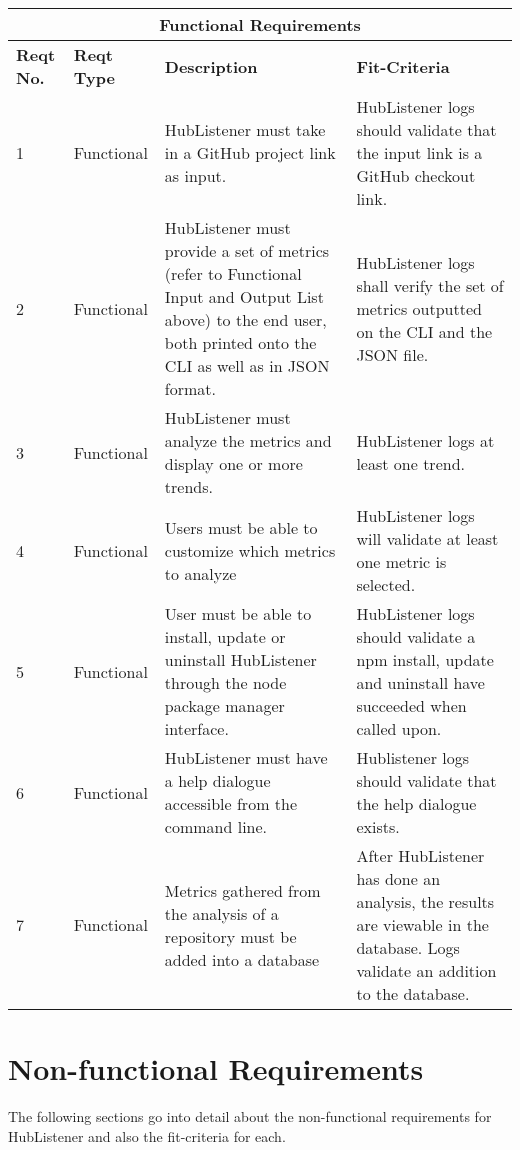 \documentclass{article}
\begin{document}
\begin{tabular}{ |p{1cm}|p{2cm}|p{5cm}|p{3cm}|  }
\hline
\multicolumn{4}{|c|}{\textbf{Functional Requirements}} \\
\hline
\textbf{Reqt No.} & \textbf{Reqt Type} & \textbf{Description} & \textbf{Fit-Criteria}\\
\hline 
1 & Functional & HubListener must take in a GitHub project link as input. & HubListener logs should validate that the input link is a GitHub checkout link. \\
\hline 
2 & Functional & HubListener must provide a set of metrics (refer to Functional Input and Output List above) to the end user, both printed onto the CLI as well as in JSON format. & HubListener logs shall verify the set of metrics outputted on the CLI and the JSON file. \\
\hline 
3 & Functional & HubListener must analyze the metrics and display one or more trends. & HubListener logs at least one trend. \\ 
\hline 
4 & Functional & Users must be able to customize which metrics to analyze & HubListener logs will validate at least one metric is selected. \\
\hline 
5 & Functional & User must be able to install, update or uninstall HubListener through the node package manager interface. & HubListener logs should validate a npm install, update and uninstall have succeeded when called upon. \\
\hline 
6 & Functional & HubListener must have a help dialogue accessible from the command line. & Hublistener logs should validate that the help dialogue exists. \\
\hline 
7 & Functional & Metrics gathered from the analysis of a repository must be added into a database & After HubListener has done an analysis, the results are viewable in the database. Logs validate an addition to the database. \\
\hline
\end{tabular}

\iffalse
\fi 
\newpage
\section{Non-functional Requirements}

The following sections go into detail about the non-functional requirements for HubListener and also the fit-criteria for each. \newline
\end{document}

